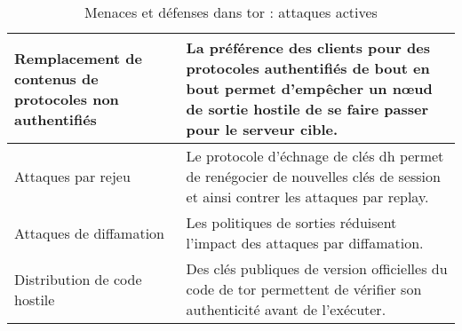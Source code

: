\begin{table}[htpb]
\begin{tabularx}{\textwidth}{
        >{\raggedright\arraybackslash}p{4.5cm}
        >{\raggedright\arraybackslash}X}
    \midrule
    Remplacement de contenus de protocoles non authentifiés & La préférence des clients pour des protocoles authentifiés de bout en bout permet d'empêcher un nœud de sortie hostile de se faire passer pour le serveur cible. \\
    \midrule
    Attaques par rejeu                                      & Le protocole d'échnage de clés \acrshort{dh} permet de renégocier de nouvelles clés de session et ainsi contrer les attaques par replay. \\ 
    \midrule
    Attaques de diffamation                                 & Les politiques de sorties réduisent l'impact des attaques par diffamation. \\ 
    \midrule
    Distribution de code hostile                            & Des clés publiques de version officielles du code de \acrshort{tor} permettent de vérifier son authenticité avant de l'exécuter. \\ 
    \bottomrule
    \end{tabularx}
    \caption{Menaces et défenses dans \acrshort{tor} : attaques actives}
    \label{tab:ad-active}
\end{table}
